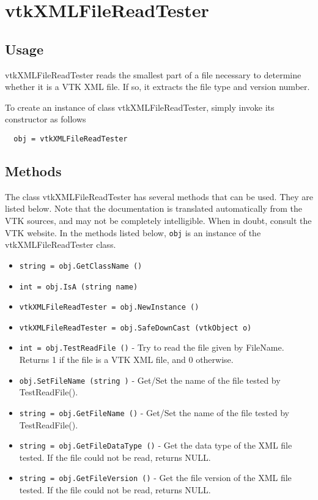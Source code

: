 \section{vtkXMLFileReadTester}

\subsection{Usage}

 vtkXMLFileReadTester reads the smallest part of a file necessary to
 determine whether it is a VTK XML file.  If so, it extracts the
 file type and version number.

To create an instance of class vtkXMLFileReadTester, simply
invoke its constructor as follows
\begin{verbatim}
  obj = vtkXMLFileReadTester
\end{verbatim}
\subsection{Methods}

The class vtkXMLFileReadTester has several methods that can be used.
  They are listed below.
Note that the documentation is translated automatically from the VTK sources,
and may not be completely intelligible.  When in doubt, consult the VTK website.
In the methods listed below, \verb|obj| is an instance of the vtkXMLFileReadTester class.
\begin{itemize}
\item  \verb|string = obj.GetClassName ()|

\item  \verb|int = obj.IsA (string name)|

\item  \verb|vtkXMLFileReadTester = obj.NewInstance ()|

\item  \verb|vtkXMLFileReadTester = obj.SafeDownCast (vtkObject o)|

\item  \verb|int = obj.TestReadFile ()| -  Try to read the file given by FileName.  Returns 1 if the file is
 a VTK XML file, and 0 otherwise.

\item  \verb|obj.SetFileName (string )| -  Get/Set the name of the file tested by TestReadFile().

\item  \verb|string = obj.GetFileName ()| -  Get/Set the name of the file tested by TestReadFile().

\item  \verb|string = obj.GetFileDataType ()| -  Get the data type of the XML file tested.  If the file could not
 be read, returns NULL.

\item  \verb|string = obj.GetFileVersion ()| -  Get the file version of the XML file tested.  If the file could not
 be read, returns NULL.

\end{itemize}
